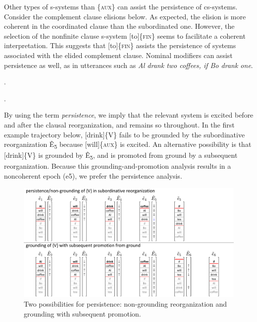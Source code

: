   Other types of s-systems than \{\textsc{aux}\} can assist the persistence of cs-systems. Consider the complement clause elisions below. As expected, the elision is more coherent in the coordinated clause than the subordinated one. However, the selection of the nonfinite clause s-system [to]\{\textsc{fin}\} seems to facilitate a coherent interpretation. This suggests that [to]\{\textsc{fin}\} assists the persistence of systems associated with the elided complement clause. Nominal modifiers can assist persistence as well, as in utterances such as \textit{Al drank two coffees, if Bo drank one}.

.
\z

.
\z

\z

  By using the term \textit{persistence}, we imply that the relevant system is excited before and after the clausal reorganization, and remains so throughout. In the first example trajectory below, [drink]\{V\} fails to be grounded by the subordinative reorganization Ê\textsubscript{5} because [will]\{\textsc{aux}\} is excited. An alternative possibility is that [drink]\{V\} is grounded by Ê\textsubscript{5},\textsubscript{} and is promoted from ground by a subsequent reorganization. Because this grounding-and-promotion analysis results in a noncoherent epoch (e5), we prefer the persistence analysis.

  
\begin{figure}
\includegraphics[width=\textwidth]{figures/Tilsen-img149.png}
\caption{Two possibilities for persistence: non-grounding reorganization and grounding with subsequent promotion.}
\label{fig:7:5}
\end{figure}
 

